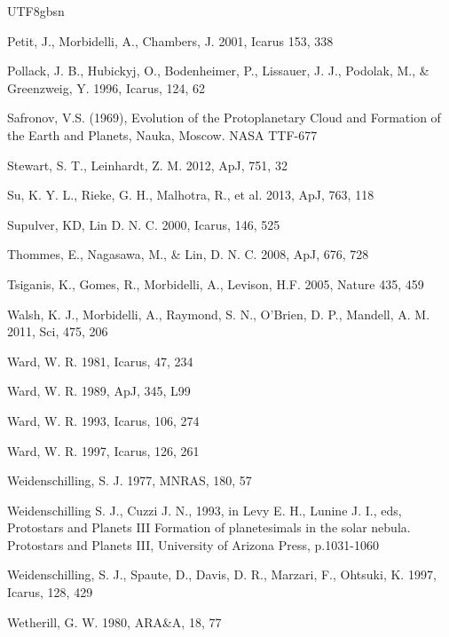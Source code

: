 \documentclass[tighten]{aastex6}
\begin{document}
\begin{CJK*}{UTF8}{gbsn}
\begin{thebibliography}{}
 Petit, J., Morbidelli, A., Chambers, J. 2001, Icarus 153, 338

 Pollack, J. B., Hubickyj, O., Bodenheimer, P., Lissauer, J. J., Podolak, M., \& Greenzweig, Y. 1996, Icarus, 124, 62


 Safronov, V.S. (1969), Evolution of the Protoplanetary Cloud and Formation of the Earth and Planets, Nauka, Moscow. NASA TTF-677

 Stewart, S. T., Leinhardt, Z. M. 2012, ApJ, 751, 32

Su, K. Y. L., Rieke, G. H., Malhotra, R., et al. 2013, ApJ, 763, 118

 Supulver, KD, Lin D. N. C. 
2000, Icarus, 146, 525


 Thommes, E., Nagasawa, 
M., \& Lin, D. N. C. 2008, ApJ, 676, 728

 Tsiganis, K., Gomes, R., Morbidelli, A., Levison, H.F. 2005, Nature 435, 459

 Walsh, K. J., Morbidelli, A., Raymond, S. N., O'Brien, D. P., Mandell, A. M. 2011, Sci, 475, 206

 Ward, W. R. 1981, Icarus, 47, 234

 Ward, W. R. 1989, ApJ, 345, L99

 Ward, W. R. 1993, Icarus, 106, 274 

 Ward, W. R. 1997, Icarus, 126, 261

 Weidenschilling, S. J. 1977, MNRAS, 180, 57

 Weidenschilling S. J., Cuzzi J. N., 1993, in Levy E. H., Lunine J. I., eds, Protostars and Planets III Formation of
planetesimals in the solar nebula. Protostars and Planets III, University of Arizona Press,
p.1031-1060

 Weidenschilling, S. J., Spaute, D., Davis, D. R., Marzari, F., Ohtsuki, K. 1997, Icarus, 128, 429


 Wetherill, G. W. 1980, ARA\&A, 18, 77


\end{thebibliography}
\end{CJK*}
\end{document}
